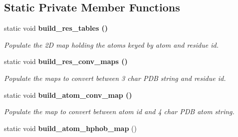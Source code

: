 \subsection*{Static Private Member Functions}
\begin{CompactItemize}
\item 
static void \bf{build\_\-res\_\-tables} ()\label{classASCbase_1_1PDB__residues_0bb938a071dfd70c2620ca490bc761cb}

\begin{CompactList}\small\item\em Populate the 2D map holding the atoms keyed by atom and residue id. \item\end{CompactList}\item 
static void \bf{build\_\-res\_\-conv\_\-maps} ()\label{classASCbase_1_1PDB__residues_cebf2dfefa17acc3f1d43defd1ac7197}

\begin{CompactList}\small\item\em Populate the maps to convert between 3 char PDB string and residue id. \item\end{CompactList}\item 
static void \bf{build\_\-atom\_\-conv\_\-map} ()\label{classASCbase_1_1PDB__residues_d644f1a2ffd15ffc31eb06f9de21a4b2}

\begin{CompactList}\small\item\em Populate the map to convert between atom id and 4 char PDB atom string. \item\end{CompactList}\item 
static void \textbf{build\_\-atom\_\-hphob\_\-map} ()\label{classASCbase_1_1PDB__residues_998bba4236cd420ca3450d4a86318a4a}

\end{CompactItemize}
